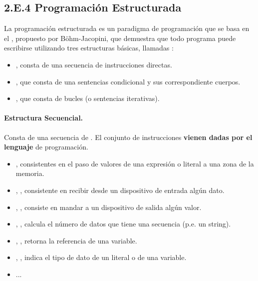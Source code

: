 \subsection*{2.E.4 Programación Estructurada}


La programación estructurada es un paradigma de programación que se basa en el , propuesto por Böhm-Jacopini,  que demuestra que todo programa puede escribirse utilizando tres estructuras básicas, llamadas :
\begin{itemize}
\item {}, consta de una secuencia de instrucciones directas.
\item {}, que consta de una sentencias condicional y sus correspondiente cuerpos.
\item {}, que consta de bucles (o sentencias iterativas).
\end{itemize}


\paragraph{Estructura Secuencial.}

Consta de una secuencia de .
El conjunto de instrucciones \textbf{vienen dadas por el lenguaje} de programación.

\begin{itemize}
\item {}, consistentes en el paso de valores de una expresión o literal a una zona de la memoria.

\item {}, , consistente en recibir desde un dispositivo de entrada algún dato.

\item {}, , consiste en mandar a un dispositivo de salida algún valor.

\item {}, , calcula el número de datos que tiene una secuencia (p.e. un string).

\item {}, , retorna la referencia de una variable.

\item {}, , indica el tipo de dato de un literal o de una variable.

\item ...
\end{itemize}


